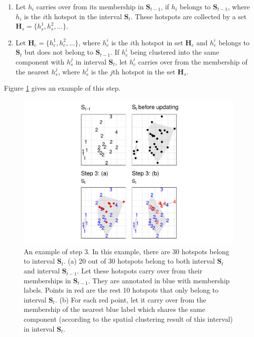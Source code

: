 \begin{enumerate}
\def\labelenumi{(\alph{enumi})}
\item
  Let \(h_i\) carries over from its membership in
  \(\boldsymbol{S}_{t-1}\), if \(h_i\) belongs to
  \(\boldsymbol{S}_{t-1}\), where \(h_i\) is the \(i\)th hotspot in the
  interval \(\boldsymbol{S}_t\). These hotspots are collected by a set
  \(\boldsymbol{H}_s = \{h_s^1,h_s^2,...\}\).
\item
  Let \(\boldsymbol{H}_c = \{h_c^1,h_c^2,...\}\), where \(h_c^i\) is the
  \(i\)th hotspot in set \(\boldsymbol{H}_c\) and \(h_c^i\) belongs to
  \(\boldsymbol{S}_t\) but does not belong to \(\boldsymbol{S}_{t-1}\).
  If \(h_c^i\) being clustered into the same component with \(h_s^j\) in
  interval \(\boldsymbol{S}_t\), let \(h_c^i\) carries over from the
  membership of the nearest \(h_s^j\), where \(h_s^j\) is the \(j\)th
  hotspot in the set \(\boldsymbol{H}_s\).
\end{enumerate}

Figure \ref{fig:step3figs} gives an example of this step.

\begin{Schunk}
\begin{figure}

{\centering \includegraphics[width=0.8\linewidth]{clustering_paper_files/figure-latex/step3figs-1} 

}

\caption{An example of step 3. In this example, there are 30 hotspots belong to interval $\boldsymbol{S}_t$. (a) 20 out of 30 hotspots belong to both interval $\boldsymbol{S}_t$ and interval $\boldsymbol{S}_{t-1}$. Let these hotspots carry over from their memberships in $\boldsymbol{S}_{t-1}$. They are annotated in blue with membership labels. Points in red are the rest 10 hotspots that only belong to interval $\boldsymbol{S}_t$. (b) For each red point, let it carry over from the membership of the nearest blue label which shares the same component (according to the spatial clustering result of this interval) in interval $\boldsymbol{S}_t$. }\label{fig:step3figs}
\end{figure}
\end{Schunk}

